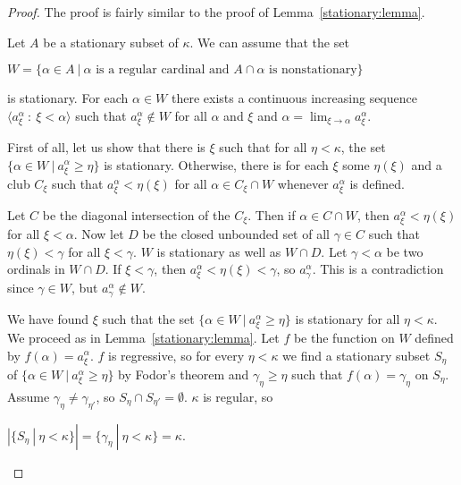 \documentclass[8pt]{article}
\theoremstyle{definition}
\theoremstyle{definition}
\theoremstyle{definition}
\theoremstyle{definition}
\theoremstyle{definition}
\theoremstyle{definition}
\theoremstyle{definition}
\theoremstyle{definition}
\theoremstyle{definition}
\theoremstyle{definition}
\theoremstyle{definition}
\theoremstyle{definition}
\theoremstyle{definition}
\theoremstyle{definition}
\theoremstyle{question}
\begin{document}
\begin{proof}
  The proof is fairly similar to the proof of Lemma~\ref{stationary:lemma}.

  Let $A$ be a stationary subset of $\kappa$. We can assume that the set
  \begin{center}
    $W = \{ \alpha \in A \: | \: \text{$\alpha$ is a regular cardinal and $A \cap \alpha$ is nonstationary}\}$
  \end{center}
  is stationary. For each $\alpha \in W$ there exists a continuous increasing sequence 
  $\langle a^{\alpha}_{\xi} \: : \: \xi < \alpha \rangle$ such that $a^{\alpha}_{\xi} \notin W$
  for all $\alpha$ and $\xi$ and $\alpha = \lim_{\xi \to \alpha} a^{\alpha}_{\xi}$.

  First of all, let us show that there is $\xi$ such that for all $\eta < \kappa$, the set
  $\{ \alpha \in W \: | \: a^{\alpha}_{\xi} \geq \eta \}$ is stationary. Otherwise, there is
  for each $\xi$ some $\eta(\xi)$ and a club $C_{\xi}$ such that $a^{\alpha}_{\xi} < \eta(\xi)$
  for all $\alpha \in C_{\xi} \cap W$ whenever $a^{\alpha}_{\xi}$ is defined.

  Let $C$ be the diagonal intersection of the $C_{\xi}$. Then if $\alpha \in C \cap W$,
  then $a^{\alpha}_{\xi} < \eta(\xi)$ for all $\xi < \alpha$. Now let $D$ be the closed unbounded
  set of all $\gamma \in C$ such that $\eta(\xi) < \gamma$ for all $\xi < \gamma$. $W$ is stationary as well as
  $W \cap D$. Let $\gamma < \alpha$ be two ordinals in $W \cap D$. If $\xi < \gamma$, then 
  $a^{\alpha}_{\xi} < \eta(\xi) < \gamma$, so $a^{\alpha}_{\gamma}$. This is a contradiction since
  $\gamma \in W$, but $a^{\alpha}_{\gamma} \notin W$.

  We have found $\xi$ such that the set $\{ \alpha \in W \: | \: a^{\alpha}_{\xi} \geq \eta \}$ is stationary
  for all $\eta < \kappa$. We proceed as in Lemma~\ref{stationary:lemma}. Let $f$ be the function on $W$ defined by
  $f(\alpha) = a^{\alpha}_{\xi}$. $f$ is regressive, so for every $\eta < \kappa$ we find a stationary subset $S_{\eta}$
  of $\{ \alpha \in W \: | \: a^{\alpha}_{\xi} \geq \eta \}$ by Fodor's theorem and $\gamma_{\eta} \geq \eta$
  such that $f(\alpha) = \gamma_{\eta}$ on $S_{\eta}$. Assume $\gamma_{\eta} \neq \gamma_{\eta'}$,
  so $S_{\eta} \cap S_{\eta'} = \emptyset$. $\kappa$ is regular, so 
  \begin{center}
  $|\{ S_{\eta} \: | \: \eta < \kappa\}| = \{ \gamma_{\eta} \: | \: \eta < \kappa \} = \kappa$.
  \end{center}
\end{proof}
\end{document}

